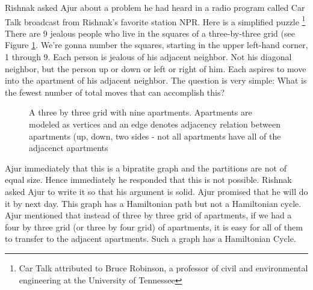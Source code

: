 Rishnak asked Ajur about a problem he had heard in a radio program called Car Talk broadcast from Rishnak's favorite station NPR. Here is a simplified puzzle
\footnote{ Car Talk attributed to Bruce Robinson, a professor of civil and environmental engineering at the University of Tennessee} There are 9 jealous people who live in the squares of a three-by-three grid (see Figure \ref{5g7}. We're gonna number the squares, starting in the upper left-hand corner, 1 through 9. Each person is jealous of his adjacent neighbor. Not his diagonal neighbor, but the person up or down or left or right of him. Each aspires to move into the apartment of his adjacent neighbor.
The question is very simple: What is the fewest number of total moves that can accomplish this?
\begin{figure}
\begin{center}
\caption{ A three by three grid with nine apartments. Apartments are modeled as vertices and an edge denotes adjacency relation between apartments (up, down, two sides - not all apartments have all of the adjacenct apartments} \label{5g7}
\end{center}
\end{figure}

Ajur immediately that this is a bipratite graph and the partitions are not of equal size. Hence immediately he responded that this is not possible. Rishnak asked Ajur to write it so that his argument is solid. Ajur promised that he will do it by next day. This graph has a Hamiltonian path but not a Hamiltonian cycle. Ajur mentioned that instead of three by three grid of apartments, if we had a four by three grid (or three by four grid) of apartments, it is easy for all of them to transfer to the adjacent apartments. Such a graph has a Hamiltonian Cycle.

